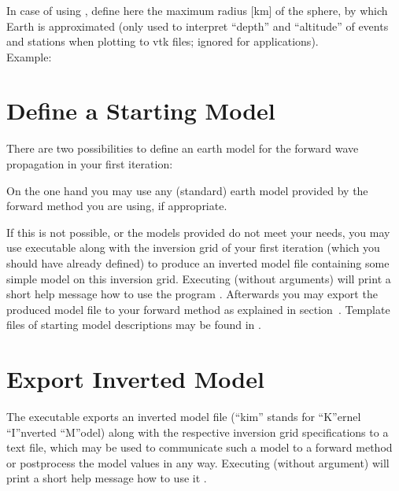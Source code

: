 \subsubsection{}
In case of using , define here the maximum radius [km] of the sphere, by which 
Earth is approximated (only used to interpret ``depth'' and ``altitude'' of events and stations when 
plotting to vtk files; ignored for  applications).\\
Example:\\
%
\section{Define a Starting Model} \label{basic_steps,sec:start_model}
%
There are two possibilities to define an earth model for the forward wave propagation in your first iteration:

On the one hand you may use any (standard) earth model provided by the forward method you are using, if appropriate.

If this is not possible, or the models provided do not meet your needs, you may use executable 
 along with the inversion grid of your first iteration (which you should 
have already defined) to produce an inverted model file containing some simple model on this inversion grid. 
Executing  (without arguments) will print a short help message how to use the program 
. Afterwards you may 
export the produced model file to your forward method as explained in section~.
Template files of starting model descriptions may be found in .
%
\section{Export Inverted Model} \label{basic_steps,sec:export_kim}
%
The executable  exports an inverted model file (``kim'' stands for ``K''ernel 
``I''nverted ``M''odel) along with the respective inversion grid specifications to a text file, 
which may be used to communicate such a model to a forward method or postprocess the model values in any way. 
Executing  (without argument) will print a short help message how to use it 
.
%
